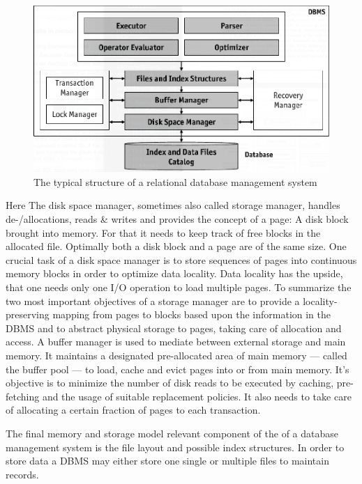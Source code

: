 \documentclass[a4paper,10pt]{article}
\begin{document}
\begin{figure}[htp]\label{dbms_arch}
 \begin{center}
  \includegraphics[keepaspectratio,width=\textwidth]{img/RDBMS.png}
 \end{center}
 \caption{The typical structure of a relational database management system } %
\end{figure}
Here The disk space manager, sometimes also called storage manager, handles de-/allocations, reads \& writes and provides the concept of a page: A disk block brought into memory. For that it needs to keep track of free blocks in the allocated file. Optimally both a disk block and a page are of the same size. One crucial task of a disk space manager is to store sequences of pages into continuous memory blocks in order to optimize data locality. Data locality has the upside, that one needs only one I/O operation to load multiple pages. To summarize the two most important objectives of a storage manager are to provide a locality-preserving mapping from pages to blocks based upon the information in the DBMS and to abstract physical storage to pages, taking care of allocation and access.
A buffer manager is used to mediate between external storage and main memory. It maintains a designated pre-allocated area of main memory --- called the buffer pool --- to load, cache and evict pages into or from main memory. It's objective is to minimize the number of disk reads to be executed by caching, pre-fetching and the usage of suitable replacement policies. It also needs to take care of allocating a certain fraction of pages to each transaction.

The final memory and storage model relevant component of the  of a database management system is the file layout and possible index structures. 
In order to store data a DBMS may either store one single or multiple files to maintain records. 
\end{document}
